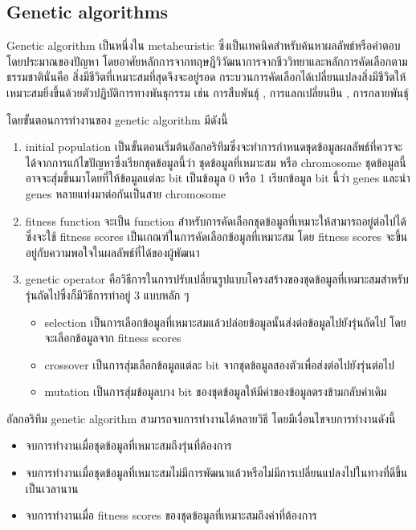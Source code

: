 \subsection{Genetic algorithms}
Genetic algorithm \cite{ga} เป็นหนึ่งใน metaheuristic ซึ่งเป็นเทคนิคสำหรับค้นหาผลลัพธ์หรือคำตอบโดยประมาณของปัญหา โดยอาศัยหลักการจากทฤษฎีวิวัฒนาการจากชีววิทยาและหลักการคัดเลือกตามธรรมชาตินั่นคือ 
สิ่งมีชีวิตที่เหมาะสมที่สุดจึงจะอยู่รอด กระบวนการคัดเลือกได้เปลี่ยนแปลงสิ่งมีชีวิตให้เหมาะสมยิ่งขึ้นด้วยตัวปฏิบัติการทางพันธุกรรม เช่น การสืบพันธุ์ , การแลกเปลี่ยนยีน , การกลายพันธุ์  


โดยขั้นตอนการทำงานของ genetic algorithm มีดังนี้ 
\begin{enumerate}
  \item initial population เป็นขั้นตอนเริ่มต้นอัลกอริทึมซึ่งจะทำการกำหนดชุดข้อมูลผลลัพธ์ที่ควรจะได้จากการแก้ไขปัญหาซึ่งเรียกชุดข้อมูลนี้ว่า ชุดข้อมูลที่เหมาะสม หรือ chromosome ชุดข้อมูลนี้อาจจะสุ่มขึ้นมาโดยที่ให้ข้อมูลแต่ละ bit เป็นข้อมูล 0 หรือ 1 เรียกข้อมูล bit นี้ว่า genes และนำ genes หลายแท่งมาต่อกันเป็นสาย chromosome 
  \item fitness function จะเป็น function สำหรับการคัดเลือกชุดข้อมูลที่เหมาะให้สามารถอยู่ต่อไปได้ซึ่งจะใช้ fitness scores เป็นเกณฑ์ในการคัดเลือกข้อมูลที่เหมาะสม
  โดย fitness scores จะขึ้นอยู่กับความพอใจในผลลัพธ์ที่ได้ของผู้พัฒนา
  \item genetic operator คือวิธีการในการปรับเปลี่ยนรูปแบบโครงสร้างของชุดข้อมูลที่เหมาะสมสำหรับรุ่นถัดไปซึ่งก็มีวิธีการทำอยู่ 3 แบบหลัก ๆ 
  \begin{itemize}
  \item selection เป็นการเลือกข้อมูลที่เหมาะสมแล้วปล่อยข้อมูลนั้นส่งต่อข้อมูลไปยังรุ่นถัดไป โดยจะเลือกข้อมูลจาก fitness scores
  \item crossover เป็นการสุ่มเลือกข้อมูลแต่ละ bit จากชุดข้อมูลสองตัวเพื่อส่งต่อไปยังรุ่นต่อไป
  \item mutation เป็นการสุ่มข้อมูลบาง bit ของชุดข้อมูลให้มีค่าของข้อมูลตรงข้ามกลับค่าเดิม
\end{itemize}
\end{enumerate}
อัลกอริทึม genetic algorithm สามารถจบการทำงานได้หลายวิธี โดยมีเงื่อนไขจบการทำงานดังนี้
\begin{itemize}
  \item จบการทำงานเมื่อชุดข้อมูลที่เหมาะสมถึงรุ่นที่ต้องการ 
  \item จบการทำงานเมื่อชุดข้อมูลที่เหมาะสมไม่มีการพัฒนาแล้วหรือไม่มีการเปลี่ยนแปลงไปในทางที่ดีขึ้นเป็นเวลานาน
  \item จบการทำงานเมื่อ fitness scores ของชุดข้อมูลที่เหมาะสมถึงค่าที่ต้องการ
\end{itemize}
